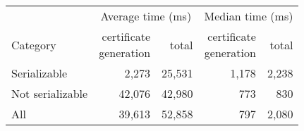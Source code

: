 \begin{table}[H]
	\centering
	\begin{tabular}{l r r r r}
		\toprule
		& \multicolumn{2}{c}{Average time (ms)} 
		& \multicolumn{2}{c}{Median time (ms)} \\
		\cmidrule(lr){2-3} \cmidrule(lr){4-5}
		Category
		& \shortstack{certificate\\generation}
		& total
		& \shortstack{certificate\\generation}
		& total \\
		\midrule
		Serializable      &   2{,}273 &  25{,}531 &  1{,}178 &  2{,}238 \\
		Not serializable  &  42{,}076 &  42{,}980 &   773 &   830 \\
		All               &  39{,}613 &  52{,}858 &   797 &  2{,}080 \\
		\bottomrule
	\end{tabular}
\end{table}
